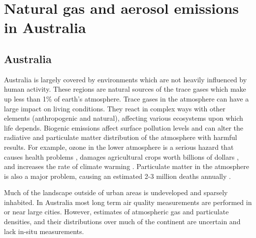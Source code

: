     
\section{Natural gas and aerosol emissions in Australia}
\label{ch_LitRev:sec:emissions}

  \subsection{Australia}

    Australia is largely covered by environments which are not heavily influenced by human activity.
    These regions are natural sources of the trace gases which make up less than 1\% of earth's atmosphere.
    Trace gases in the atmosphere can have a large impact on living conditions.
    They react in complex ways with other elements (anthropogenic and natural), affecting various ecosystems upon which life depends.
    Biogenic emissions affect surface pollution levels and can alter the radiative and particulate matter distribution of the atmosphere with harmful results.
    For example, ozone in the lower atmosphere is a serious hazard that causes health problems \citep{Hsieh2013}, damages agricultural crops worth billions of dollars \citep{Avnery2011}, and increases the rate of climate warming \citep{IPCC_2013_chap8}.
    Particulate matter in the atmosphere is also a major problem, causing an estimated 2-3 million deaths annually \citep{Hoek2013, Krewski2009, Silva2013, Lelieveld2015}. 

    Much of the landscape outside of urban areas is undeveloped and sparsely inhabited.
    In Australia most long term air quality measurements are performed in or near large cities.
    However, estimates of atmospheric gas and particulate densities, and their distributions over much of the continent are uncertain and lack in-situ measurements.
    
